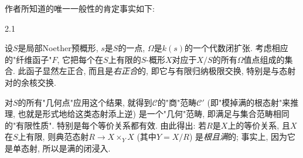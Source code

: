 \par{}作者所知道的唯一一般性的肯定事实如下:
\begin{proposition}{2.1}\label{fga3.iii-2-proposition-2.1}\skipsinglepar
\par{}设\(S\)是局部Noether预概形, \(s\)是\(S\)的一点, \(\Omega \)是\(k(s)\)的一个代数闭扩张. 考虑相应的"纤维函子"\(F\), 它把每个在\(S\)上有限的\(S\)-概形\(X\)对应于\(X/S\)的所有\(\Omega \)值点组成的集合. 此函子显然左正合, 而且是\emph{右正合}的, 即它与有限归纳极限交换, 特别是与态射对的余核交换.
\end{proposition}
\par{}对\(S\)的所有"几何点"应用这个结果, 就得到\(\mathcal {C}\)的"商"范畴\(\mathcal {C}'\) (即"模掉满的根态射"来推理, 也就是形式地给这类态射添上逆) 是一个"几何"范畴, 即满足与集合范畴相同的"有限性质". 特别是每个等价关系都有效. 由此得出: 若\(R\)是\(X\)上的等价关系, 且\(X\)在\(S\)上有限, 则典范态射\(R\to  X\times _Y X\) (其中\(Y=X/R\)) 是\emph{根且满}的; 事实上, 因为它是单态射, 所以是满的闭浸入.
